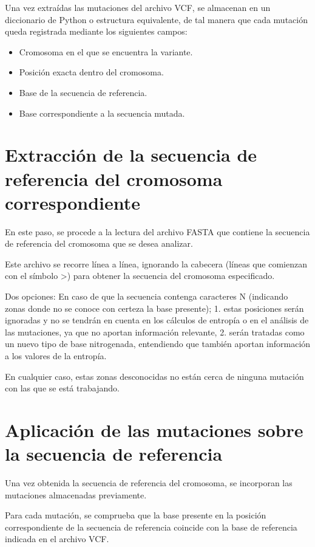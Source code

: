 \documentclass[11pt,spanish,listoffigures,listoftables]{tfgetsinf}
\begin{document}
Una vez extraídas las mutaciones del archivo VCF, se almacenan en un diccionario de Python o estructura equivalente, de tal manera que cada mutación queda registrada mediante los siguientes campos:

\begin{itemize}
   \item Cromosoma en el que se encuentra la variante.
   \item Posición exacta dentro del cromosoma.
   \item Base de la secuencia de referencia.
   \item Base correspondiente a la secuencia mutada.
\end{itemize}

\section{Extracción de la secuencia de referencia del cromosoma correspondiente}

En este paso, se procede a la lectura del archivo FASTA que contiene la secuencia de referencia del cromosoma que se desea analizar.

Este archivo se recorre línea a línea, ignorando la cabecera (líneas que comienzan con el símbolo >) para obtener la secuencia del cromosoma especificado.

Dos opciones: En caso de que la secuencia contenga caracteres N (indicando zonas donde no se conoce con certeza la base presente);
1. estas posiciones serán ignoradas y no se tendrán en cuenta en los cálculos de entropía o en el análisis de las mutaciones, ya que no aportan información relevante,
2. serán tratadas como un nuevo tipo de base nitrogenada, entendiendo que también aportan información a los valores de la entropía.

En cualquier caso, estas zonas desconocidas no están cerca de ninguna mutación con las que se está trabajando.

\section{Aplicación de las mutaciones sobre la secuencia de referencia}

Una vez obtenida la secuencia de referencia del cromosoma, se incorporan las mutaciones almacenadas previamente.

Para cada mutación, se comprueba que la base presente en la posición correspondiente de la secuencia de referencia coincide con la base de referencia indicada en el archivo VCF.
\end{document}
